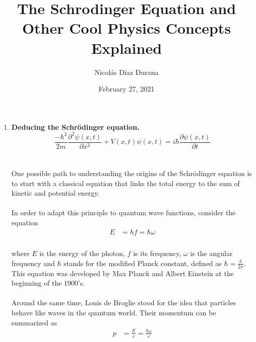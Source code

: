\documentclass[letter]{article}
\title{The Schrodinger Equation and Other Cool Physics Concepts Explained}
\author{Nicolás Díaz Durana}
\date{February 27, 2021}
\begin{document}
\maketitle


\begin{enumerate}
    
    \item \textbf{Deducing the Schrödinger equation.}\\
    $$\frac{-\hbar^2}{2m}\frac{\partial^2\psi(x,t)}{\partial x^2}+V(x,t)\psi(x,t)=i\hbar \frac{\partial \psi(x,t)}{\partial t}$$\\
    \paragraph{}One possible path to understanding the origins of the Schrödinger equation is to start with a classical equation that links the total energy to the sum of kinetic and potential energy. 
    \paragraph{}In order to adapt this principle to quantum wave functions, consider the equation
    \begin{equation}
        \begin{split}
            E &= hf =\hbar \omega\\
        \end{split}
    \end{equation}
    \paragraph{}where $E$ is the energy of the photon, $f$ is its frequency, $\omega$ is the angular frequency and $\hbar$ stands for the modified Planck constant, defined as $\hbar=\frac{h}{2\pi}$. This equation was developed by Max Planck and Albert Einstein at the beginning of the 1900's. 
    \paragraph{} Around the same time, Louis de Broglie stood for the idea that particles behave like waves in the quantum world. Their momentum can be summarized as 
    \begin{equation}
        \begin{split}
            p &= \frac{E}{c}=\frac{\hbar \omega}{c}\\
        \end{split}
    \end{equation}

\end{enumerate}
\end{document}
